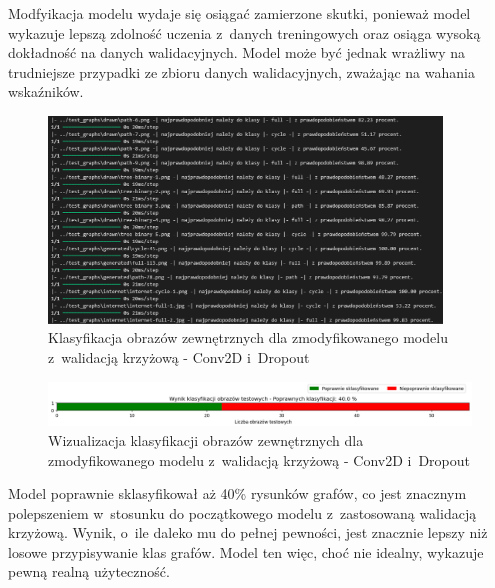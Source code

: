 Modfyikacja modelu wydaje się osiągać zamierzone skutki,
ponieważ model wykazuje lepszą zdolność uczenia z~danych treningowych
oraz osiąga wysoką dokładność na danych walidacyjnych.
Model może być jednak wrażliwy na trudniejsze przypadki ze zbioru danych walidacyjnych,
zważając na wahania wskaźników.

\begin{figure}[ht]
	\centering
	\includegraphics[height=5.5cm]{resources/tests/images/v4/crossvalid_1_txt.png}
	\caption{Klasyfikacja obrazów zewnętrznych dla zmodyfikowanego modelu z~walidacją krzyżową - Conv2D i~Dropout}
	\label{Fig:tests-cv-1b}
\end{figure}
\FloatBarrier

\begin{figure}[ht]
	\centering
	\includegraphics[width=14cm]{resources/tests/images/v4/crossvalid_1_bar.png}
	\caption{Wizualizacja klasyfikacji obrazów zewnętrznych dla zmodyfikowanego modelu z~walidacją krzyżową - Conv2D i~Dropout}
	\label{Fig:tests-cv-1c}
\end{figure}
\FloatBarrier

Model poprawnie sklasyfikował aż 40\% rysunków grafów,
co jest znacznym polepszeniem w~stosunku do początkowego modelu z~zastosowaną walidacją krzyżową.
Wynik, o~ile daleko mu do pełnej pewności, jest znacznie lepszy niż losowe przypisywanie klas grafów.
Model ten więc, choć nie idealny, wykazuje pewną realną użyteczność.

